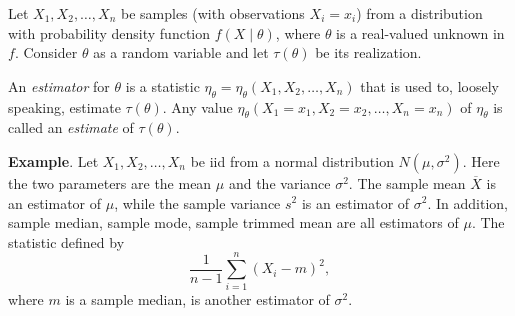 \documentclass[12pt]{article}
\begin{document}

Let $X_1,X_2,\ldots,X_n$ be samples (with observations $X_i=x_i$) from a distribution with probability density function $f(X\mid\theta)$, where $\theta$ is a real-valued unknown  in $f$.  Consider $\theta$ as a random variable and let $\tau(\theta)$ be its realization.  

An \emph{estimator} for $\theta$ is a statistic $\eta_{\theta}=\eta_{\theta}(X_1,X_2,\ldots,X_n)$ that is used to, loosely speaking, estimate $\tau(\theta)$.  Any value $\eta_{\theta}(X_1=x_1,X_2=x_2,\ldots,X_n=x_n)$ of $\eta_{\theta}$ is called an \emph{estimate} of $\tau(\theta)$.

\textbf{Example}.
Let $X_1,X_2,\ldots,X_n$ be iid from a normal distribution $N(\mu,\sigma^2)$.  Here the two parameters are the mean $\mu$ and the variance $\sigma^2$.  The sample mean $\overline{X}$ is an estimator of $\mu$, while the sample variance $s^2$ is an estimator of $\sigma^2$.  In addition, sample median, sample mode, sample trimmed mean are all estimators of $\mu$.  The statistic defined by 
$$\frac{1}{n-1}\sum_{i=1}^{n}(X_i-m)^2,$$
where $m$ is a sample median, is another estimator of $\sigma^2$.
\end{document}
